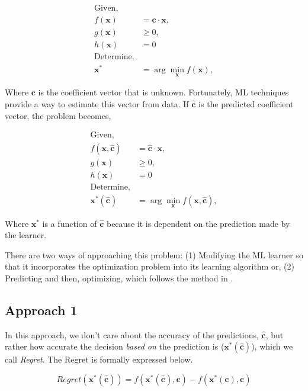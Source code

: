 \documentclass[12pt, letterpaper]{article}
\begin{document}
\begin{align}
    \text{Given,}  & \\
    f(\mathbf{x}) &= \mathbf{c} \cdot \mathbf{x}, \\
    g(\mathbf{x}) &\geq 0, \\
    h(\mathbf{x}) &= 0 \\
    \text{Determine,} & \\
    \mathbf{x}^* &= \arg \min_{\mathbf{x}} f(\mathbf{x}),
\end{align}

Where $\mathbf{c}$ is the coefficient vector that is unknown. Fortunately, ML techniques provide a way to 
estimate this vector from data. If $\hat{\mathbf{c}}$ is the predicted coefficient vector, the problem 
becomes,

\begin{align}
    \text{Given,}  & \\
    f(\mathbf{x}, \hat{\mathbf{c}}) &= \hat{\mathbf{c}} \cdot \mathbf{x}, \\
    g(\mathbf{x}) &\geq 0, \\
    h(\mathbf{x}) &= 0 \\
    \text{Determine,} & \\
    \mathbf{x}^*(\hat{\mathbf{c}}) &= \arg \min_{\mathbf{x}} f(\mathbf{x}, \hat{\mathbf{c}}),
\end{align}

Where $\mathbf{x}^*$ is a function of $\hat{\mathbf{c}}$ because it is dependent on the prediction made
by the learner. 

There are two ways of approaching this problem: (1) Modifying the ML learner so that it incorporates the 
optimization problem into its learning algorithm or, (2) Predicting and then, optimizing, which follows
the method in \cite{spo}.

\subsection{Approach 1}
In this approach, we don't care about the accuracy of the predictions, $\hat{\mathbf{c}}$, but rather how
accurate the decision \textit{based on} the prediction is ($\mathbf{x}^*(\hat{\mathbf{c}})$), which we 
call \textit{Regret}. The Regret is formally expressed below.

\begin{equation}
    Regret(\mathbf{x}^*(\hat{\mathbf{c}})) = f(\mathbf{x}^*(\hat{\mathbf{c}}), \mathbf{c}) - f(\mathbf{x}^*(\mathbf{c}), \mathbf{c})
\end{equation}
\end{document}
